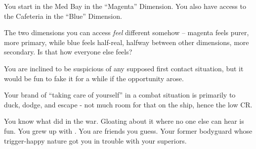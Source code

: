 \documentclass[char]{TMFHope}
\begin{document}
\begin{itemz}[Notes]
	\item You start in the Med Bay in the ``Magenta'' Dimension. You also have access to the Cafeteria in the ``Blue'' Dimension. 
	\item The two dimensions you can access {\em feel} different somehow -- magenta feels purer, more primary, while blue feels half-real, halfway between other dimensions, more secondary.  Is that how everyone else feels?
	\item You are inclined to be suspicious of any supposed first contact situation, but it would be fun to fake it for a while if the opportunity arose.
	\item Your brand of ``taking care of yourself'' in a combat situation is primarily to duck, dodge, and escape - not much room for that on the ship, hence the low CR.
\end{itemz}

\begin{contacts}
	\contact{\cXO{}} You know what \cXO{\they} did in the war. Gloating about it where no one else can hear is fun.
	\contact{\cMed{}} You grew up with \cMed{\them}. You are friends you guess.
	\contact{\cWeap{}} Your former bodyguard whose trigger-happy nature got you in trouble with your superiors.
\end{contacts}
\end{document}
